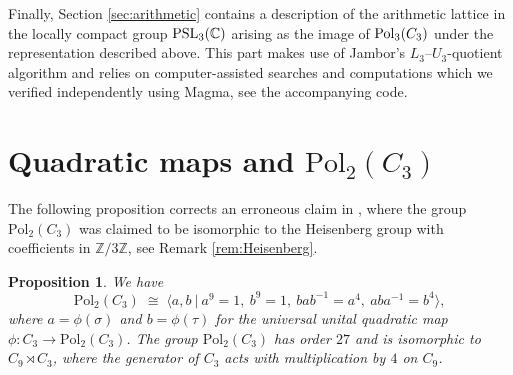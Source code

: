 \documentclass[11pt, a4paper]{amsproc}
\newtheorem{prop}{Proposition}
\theoremstyle{remark}
\theoremstyle{plain}
\begin{document}
Finally, Section \ref{sec:arithmetic} contains a description of the arithmetic lattice in the locally compact group ${\rm PSL}_3(\mathbb C)$ arising as the image of ${\rm Pol}_3(C_3)$ under the representation described above. This part makes use of Jambor's $L_3$--$U_3$-quotient algorithm \cite{Jam12} and relies on computer-assisted searches and computations which we verified independently using Magma, see the accompanying code.

\section{Quadratic maps and $\mathrm{Pol}_2(C_3)$}
\label{sec:quadratic}

The following proposition corrects an erroneous claim in \cite[Remark 4.5]{AJ}, where the group $\mathrm{Pol}_2(C_3)$ was claimed to be isomorphic to the Heisenberg group with coefficients in $\mathbb{Z}/3\mathbb{Z}$, see Remark \ref{rem:Heisenberg}. 

\begin{prop}\label{prop:Pol2C3-symmetric}
We have
\begin{equation}\label{eq:symmetric}
\mathrm{Pol}_2(C_3)\;\cong\;\Big\langle a,b\ \Big|\ a^9=1,\ b^9=1,\ bab^{-1}=a^4,\ aba^{-1}=b^4\Big\rangle,
\end{equation}
where $a=\phi(\sigma)$ and $b=\phi(\tau)$ for the universal unital quadratic map
$\phi:C_3\to \mathrm{Pol}_2(C_3)$. The group $\mathrm{Pol}_2(C_3)$ has order $27$ and is isomorphic to $C_9 \rtimes C_3$, where the generator of $C_3$ acts with multiplication by $4$ on $C_9$.
\end{prop}
\end{document}
